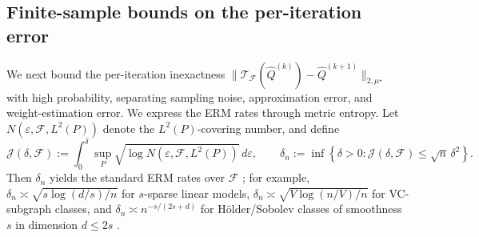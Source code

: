 \documentclass{article}
\theoremstyle{plain}
\theoremstyle{definition}
\theoremstyle{remark}
\begin{document}
\subsection{Finite-sample bounds on the per-iteration error}

We next bound the per-iteration inexactness $\|\mathcal T_{\mathcal F}(\widehat Q^{(k)})
  -\widehat Q^{(k+1)}\|_{2,\mu^\star}$ with high probability, separating sampling noise, approximation error, and
weight-estimation error. We express the ERM rates through metric entropy. Let
\(N(\varepsilon,\mathcal F,L^2(P))\) denote the \(L^2(P)\)-covering number, and
define
\[
\mathcal J(\delta,\mathcal F)
:=
\int_0^\delta
\sup_P
\sqrt{\log N(\varepsilon,\mathcal F,L^2(P))}\,d\varepsilon,
\qquad
\delta_n
:=
\inf\left\{
\delta>0:
\mathcal J(\delta,\mathcal F)
\le
\sqrt n\,\delta^2
\right\}.
\]
Then \(\delta_n\) yields the standard ERM rates over \(\mathcal F\)
\citep{wainwright2019high}; for example,
\(\delta_n\asymp \sqrt{s\log(d/s)/n}\) for \(s\)-sparse linear models,
\(\delta_n\asymp \sqrt{V\log(n/V)/n}\) for VC-subgraph classes, and
\(\delta_n\asymp n^{-s/(2s+d)}\) for H\"older/Sobolev classes of smoothness
\(s\) in dimension \(d\le 2s\) \citep{wainwright2019high}.
\end{document}
